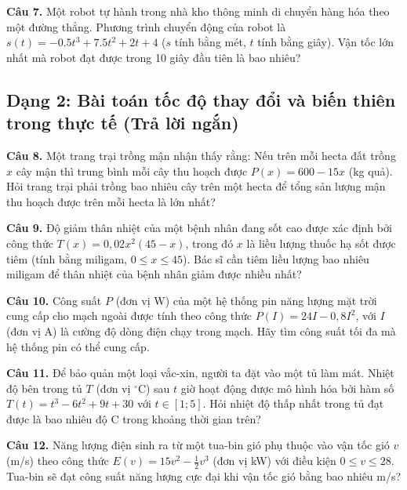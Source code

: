 \documentclass[12pt]{article}
\begin{document}
	\vspace{0.5cm}
	\noindent \textbf{Câu 7.} Một robot tự hành trong nhà kho thông minh di chuyển hàng hóa theo một đường thẳng. Phương trình chuyển động của robot là $s(t) = -0.5t^3 + 7.5t^2 + 2t + 4$ ($s$ tính bằng mét, $t$ tính bằng giây). Vận tốc lớn nhất mà robot đạt được trong 10 giây đầu tiên là bao nhiêu?
	
	
	\subsection{Dạng 2: Bài toán tốc độ thay đổi và biến thiên trong thực tế (Trả lời ngắn)}
	
	\noindent \textbf{Câu 8.} Một trang trại trồng mận nhận thấy rằng: Nếu trên mỗi hecta đất trồng $x$ cây mận thì trung bình mỗi cây thu hoạch được $P(x) = 600 - 15x$ (kg quả). Hỏi trang trại phải trồng bao nhiêu cây trên một hecta để tổng sản lượng mận thu hoạch được trên mỗi hecta là lớn nhất?
	
	\vspace{0.5cm}
	\noindent \textbf{Câu 9.} Độ giảm thân nhiệt của một bệnh nhân đang sốt cao được xác định bởi công thức $T(x) = 0,02x^2(45 - x)$, trong đó $x$ là liều lượng thuốc hạ sốt được tiêm (tính bằng miligam, $0 \le x \le 45$). Bác sĩ cần tiêm liều lượng bao nhiêu miligam để thân nhiệt của bệnh nhân giảm được nhiều nhất?
	
	\vspace{0.5cm}
	\noindent \textbf{Câu 10.} Công suất $P$ (đơn vị W) của một hệ thống pin năng lượng mặt trời cung cấp cho mạch ngoài được tính theo công thức $P(I) = 24I - 0,8I^2$, với $I$ (đơn vị A) là cường độ dòng điện chạy trong mạch. Hãy tìm công suất tối đa mà hệ thống pin có thể cung cấp.
	
	\vspace{0.5cm}
	\noindent \textbf{Câu 11.} Để bảo quản một loại vắc-xin, người ta đặt vào một tủ làm mát. Nhiệt độ bên trong tủ $T$ (đơn vị $^\circ\text{C}$) sau $t$ giờ hoạt động được mô hình hóa bởi hàm số $T(t) = t^3 - 6t^2 + 9t + 30$ với $t \in [1; 5]$. Hỏi nhiệt độ thấp nhất trong tủ đạt được là bao nhiêu độ C trong khoảng thời gian trên?
	
	\vspace{0.5cm}
	\noindent \textbf{Câu 12.} Năng lượng điện sinh ra từ một tua-bin gió phụ thuộc vào vận tốc gió $v$ (m/s) theo công thức $E(v) = 15v^2 - \frac{1}{2}v^3$ (đơn vị kW) với điều kiện $0 \le v \le 28$. Tua-bin sẽ đạt công suất năng lượng cực đại khi vận tốc gió bằng bao nhiêu m/s?
	
\end{document}
